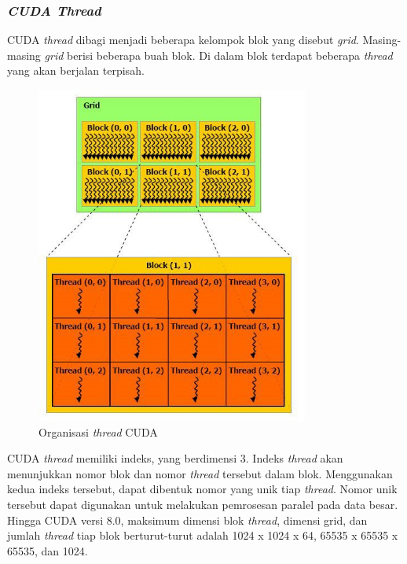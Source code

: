     \subsubsection{\emph{CUDA Thread}}
    
      CUDA \emph{thread} dibagi menjadi beberapa kelompok blok yang disebut \emph{grid}. Masing-masing \emph{grid} berisi beberapa buah blok. Di dalam blok terdapat beberapa \emph{thread} yang akan berjalan terpisah. 
      
      \begin{figure}[htb]
        \centering
        \includegraphics[width=0.8\textwidth]{resources/cudathread.jpg}
        \caption[Organisasi \emph{thread} CUDA]{Organisasi \emph{thread} CUDA \citep{cuda}}
      \end{figure}
      
      CUDA \emph{thread} memiliki indeks, yang berdimensi 3. Indeks \emph{thread} akan menunjukkan nomor blok dan nomor \emph{thread} tersebut dalam blok. Menggunakan kedua indeks tersebut, dapat dibentuk nomor yang unik tiap \emph{thread}. Nomor unik tersebut dapat digunakan untuk melakukan pemrosesan paralel pada data besar. Hingga CUDA versi 8.0, maksimum dimensi blok \emph{thread}, dimensi grid, dan jumlah \emph{thread} tiap blok berturut-turut adalah 1024 x 1024 x 64, 65535 x 65535 x 65535, dan 1024.

